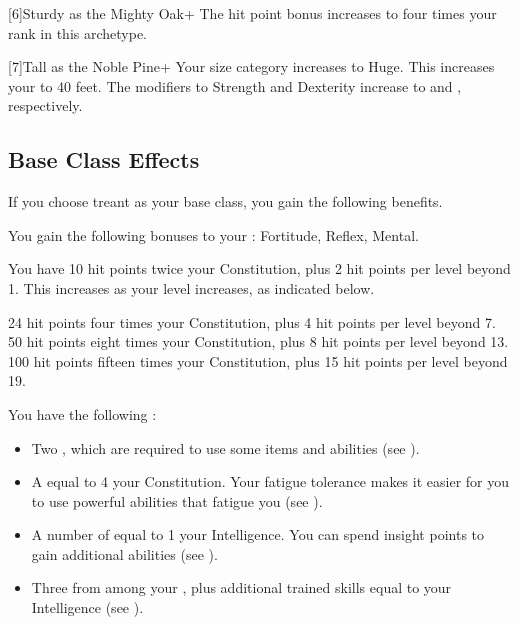         [6]{Sturdy as the Mighty Oak+} The hit point bonus increases to four times your rank in this archetype.

        [7]{Tall as the Noble Pine+} Your size category increases to Huge.
        This increases your  to 40 feet.
        The modifiers to Strength and Dexterity increase to  and , respectively.

    \subsection{Base Class Effects}
        If you choose treant as your base class, you gain the following benefits.

        You gain the following bonuses to your :  Fortitude,  Reflex,  Mental.

            You have 10 hit points \add twice your Constitution, plus 2 hit points per level beyond 1.
            This increases as your level increases, as indicated below.
            \begin{itemize}
                 24 hit points \add four times your Constitution, plus 4 hit points per level beyond 7.
                 50 hit points \add eight times your Constitution, plus 8 hit points per level beyond 13.
                 100 hit points \add fifteen times your Constitution, plus 15 hit points per level beyond 19.
            \end{itemize}

         You have the following :
        \begin{itemize}
            \item Two , which are required to use some items and abilities (see ).
            \item A  equal to 4 \add your Constitution.
                Your fatigue tolerance makes it easier for you to use powerful abilities that fatigue you (see ).
            \item A number of  equal to 1 \add your Intelligence.
                You can spend insight points to gain additional abilities (see ).
            \item Three  from among your , plus additional trained skills equal to your Intelligence (see ).
        \end{itemize}

